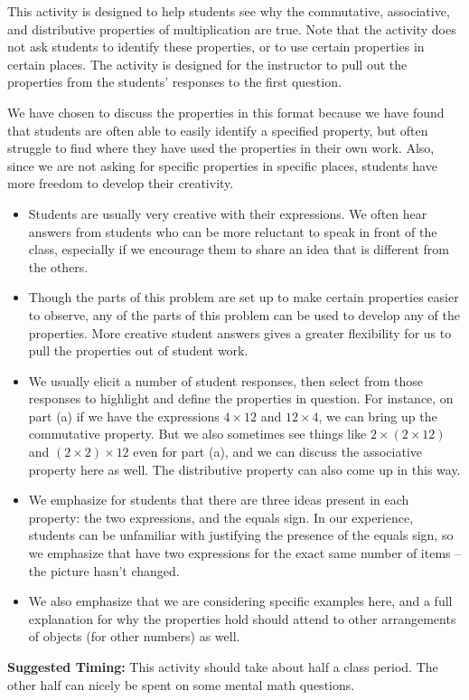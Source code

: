 \documentclass[nooutcomes]{ximera}
\begin{document}
\newpage
\begin{instructorNotes}
This activity is designed to help students see why the commutative, associative, and distributive properties of multiplication are true.  Note that the activity does not ask students to identify these properties, or to use certain properties in certain places.  The activity is designed for the instructor to pull out the properties from the students' responses to the first question.

We have chosen to discuss the properties in this format because we have found that students are often able to easily identify a specified property, but often struggle to find where they have used the properties in their own work.  Also, since we are not asking for specific properties in specific places, students have more freedom to develop their creativity.

\begin{itemize}
    \item Students are usually very creative with their expressions.  We often hear answers from students who can be more reluctant to speak in front of the class, especially if we encourage them to share an idea that is different from the others.
    \item Though the parts of this problem are set up to make certain properties easier to observe, any of the parts of this problem can be used to develop any of the properties.  More creative student answers gives a greater flexibility for us to pull the properties out of student work.
    \item We usually elicit a number of student responses, then select from those responses to highlight and define the properties in question.  For instance, on part (a) if we have the expressions $4 \times 12$ and $12 \times 4$, we can bring up the commutative property.  But we also sometimes see things like $2 \times (2\times 12)$ and $(2 \times 2) \times 12$ even for part (a), and we can discuss the associative property here as well.  The distributive property can also come up in this way.
    \item We emphasize for students that there are three ideas present in each property: the two expressions, and the equals sign.  In our experience, students can be unfamiliar with justifying the presence of the equals sign, so we emphasize that have two expressions for the exact same number of items -- the picture hasn't changed.
    \item We also emphasize that we are considering specific examples here, and a full explanation for why the properties hold should attend to other arrangements of objects (for other numbers) as well.
\end{itemize}


{\bf Suggested Timing:} This activity should take about half a class period.  The other half can nicely be spent on some mental math questions.
\end{instructorNotes}
\end{document}
